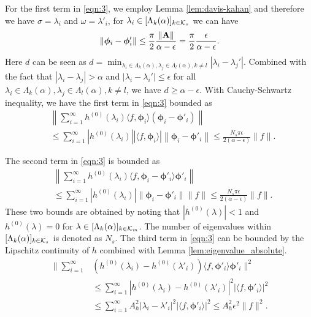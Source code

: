 For the first term in \eqref{eqn:3}, we employ Lemma \ref{lem:davis-kahan} and therefore we have $\sigma=\lambda_i$ and $\omega=\lambda'_i$, for $\lambda_i\in [\Lambda_k(\alpha)]_{k\in{\ensuremath{\mathcal K}}_s}$ we can have
\begin{align}
\left\| \bm\phi_i -\bm\phi'_i \right\| \leq \frac{\pi}{2} \frac{\|{\mathbf A}\|}{\alpha-\epsilon}= \frac{\pi}{2} \frac{\epsilon}{\alpha-\epsilon}.
\end{align}
Here $d$ can be seen as $d=\min_{\lambda_i\in\Lambda_k(\alpha),\lambda_j\in\Lambda_l(\alpha),k\neq l}|\lambda_i-\lambda_j'|$. Combined with the fact that $|\lambda_i-\lambda_j|>\alpha$ and $|\lambda_i-\lambda_i'|\leq \epsilon$ for all $\lambda_i\in\Lambda_k(\alpha),\lambda_j\in\Lambda_l(\alpha),k\neq l$, we have $d\geq \alpha-\epsilon$. With Cauchy-Schwartz inequality, we have the first term in \eqref{eqn:3} bounded as
\begin{align}
&\nonumber\left\| \sum_{i=1}^\infty h^{(0)}(\lambda_i )\langle f, \bm\phi_i \rangle (\bm\phi_i - \bm\phi'_i ) \right\|\\
& \leq \sum_{i=1}^\infty |h^{(0)}(\lambda_i)| | \langle f, \bm\phi_i \rangle | \left\|\bm\phi_i-\bm\phi'_i \right\| \leq  \frac{N_s\pi\epsilon}{2(\alpha-\epsilon)}  \|f\|.
\end{align}

The second term in \eqref{eqn:3} is bounded as
\begin{align}
 &\nonumber \left\|  \sum_{i =1}^\infty  h^{(0)}(\lambda_i )\langle f, \bm\phi_i - \bm\phi'_i  \rangle \bm\phi'_i \right\| \\
 &\leq   \sum_{i =1}^\infty |h^{(0)}(\lambda_i)| \|\bm\phi_i - \bm\phi'_i \| \|f\| \leq   \frac{N_s \pi\epsilon}{2(\alpha-\epsilon)}  \|f\|.
\end{align}
These two bounds are obtained by noting that $|h^{(0)}(\lambda)|<1$ and $h^{(0)}(\lambda)=0$ for $\lambda\in[\Lambda_k(\alpha)]_{k\in{\ensuremath{\mathcal K}}_m}$. The number of eigenvalues within $[\Lambda_k(\alpha)]_{k\in{\ensuremath{\mathcal K}}_s}$ is denoted as $N_s$. The third term in \eqref{eqn:3} can be bounded by the Lipschitz continuity of $h$ combined with Lemma \ref{lem:eigenvalue_absolute}.
\begin{align}
\nonumber  \Bigg\|\sum_{i=1}^\infty  &(h^{(0)}(\lambda_i ) -h^{(0)}(\lambda'_i) ) \langle f, \bm\phi'_i \rangle \bm\phi'_i  \Bigg\|^2 
  \\ \nonumber & \leq \sum_{i=1}^\infty | h^{(0)}(\lambda_{i}) -h^{(0)}(\lambda'_i) |^2 |\langle f, \bm\phi'_i \rangle|^2 \\
  &\leq \sum_{i =1}^\infty A_h^2 |\lambda_i - \lambda'_i |^2 |\langle f, \bm\phi'_i \rangle|^2 \leq  A_h^2 \epsilon^2 \|f\|^2.
\end{align}

